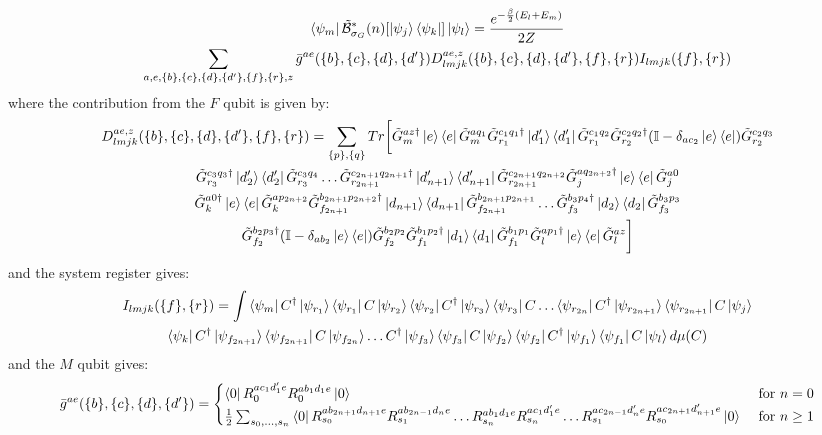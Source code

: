 \documentclass[aps,floatfix,10pt,amssymb,amsfont,amsmath,superscriptaddress,float,nofootinbib,longbibliography,nobalancelastpage,twocolumn]{revtex4-2}
\begin{document}
\begin{multline}
    \bra{\psi_m}\tilde{\mathcal{B}}^*_{\sigma_G}(n)[\ket{\psi_j}\bra{\psi_k}]\ket{\psi_l} = \frac{e^{-\frac{\beta}{2}(E_l+E_m)}}{2Z}\\\sum_{a,e,\{b\},\{c\},\{d\},\{d'\},\{f\},\{r\},z} \bar g^{ae}(\{b\},\{c\},\{d\},\{d'\}) D^{ae,z}_{lmjk}(\{b\},\{c\},\{d\},\{d'\},\{f\},\{r\})I_{lmjk}(\{f\},\{r\})
    \label{eq:B*def}
\end{multline}
where the contribution from the $F$ qubit is given by:
\begin{multline}
    D^{ae,z}_{lmjk}(\{b\},\{c\},\{d\},\{d'\},\{f\},\{r\}) = 
    \sum_{\{p\},\{q\}}
Tr\bigg[\tilde G^{az\dagger}_m\ket{e}\bra{e}\tilde G^{aq_1}_m\tilde G^{c_1q_1\dagger}_{r_1}\ket{d'_1}\bra{d'_1}\tilde G^{c_1q_2}_{r_1}\tilde G^{c_2q_2\dagger}_{r_2}(\mathbb{I} - \delta_{ac_2}\ket{e}\bra{e})\tilde G^{c_2q_3}_{r_2}\\\tilde G^{c_3q_3\dagger}_{r_3}\ket{d'_2}\bra{d'_2}\tilde G^{c_3q_4}_{r_3}\ldots
\tilde G^{c_{2n+1}q_{2n+1}\dagger}_{r_{2n+1}}\ket{d'_{n+1}}\bra{d'_{n+1}}\tilde G^{c_{2n+1}q_{2n+2}}_{r_{2n+1}}\tilde G^{aq_{2n+2}\dagger}_j\ket{e}\bra{e}\tilde G^{a0}_j\\ \tilde G^{a0\dagger}_k\ket{e}\bra{e}\tilde G^{ap_{2n+2}}_k\tilde G^{b_{2n+1}p_{2n+2}\dagger}_{f_{2n+1}}\ket{d_{n+1}}\bra{d_{n+1}}\tilde G^{b_{2n+1}p_{2n+1}}_{f_{2n+1}}\ldots \tilde G^{b_3p_4\dagger}_{f_3}\ket{d_2}\bra{d_2}\tilde G^{b_3p_3}_{f_3}\\\tilde G^{b_2p_3\dagger}_{f_2}(\mathbb{I} - \delta_{ab_2}\ket{e}\bra{e})\tilde G^{b_2p_2}_{f_2}\tilde G^{b_1p_2\dagger}_{f_1}\ket{d_1}\bra{d_1}\tilde G^{b_1p_1}_{f_1}\tilde G^{ap_1\dagger}_l\ket{e}\bra{e}\tilde G^{az}_l\bigg]
\end{multline}
and the system register gives:
\begin{multline}
I_{lmjk}(\{f\},\{r\})=\int\bra{\psi_m}C^{\dagger}\ket{\psi_{r_1}}\bra{\psi_{r_1}}C\ket{\psi_{r_2}}\bra{\psi_{r_2}}C^{\dagger}\ket{\psi_{r_3}}\bra{\psi_{r_3}}C\ldots \bra{\psi_{r_{2n}}}C^{\dagger}\ket{\psi_{r_{2n+1}}}\bra{\psi_{r_{2n+1}}}C\ket{\psi_{j}}\\
\bra{\psi_{k}}C^{\dagger}\ket{\psi_{f_{2n+1}}}\bra{\psi_{f_{2n+1}}}C\ket{\psi_{f_{2n}}}\ldots C^{\dagger}\ket{\psi_{f_3}}\bra{\psi_{f_3}}C\ket{\psi_{f_2}}\bra{\psi_{f_2}}C^{\dagger}\ket{\psi_{f_1}}\bra{\psi_{f_1}}C\ket{\psi_l}d\mu(C)
\end{multline}
and the $M$ qubit gives:
\begin{equation}
       \bar g^{ae}(\{b\},\{c\},\{d\},\{d'\}) = \begin{cases} \bra{0}R_{0}^{ac_1d'_1e}R_{0}^{ab_1d_1e}\ket{0}& \text{ for } n = 0\\
       \frac12\sum_{s_0,\ldots,s_n}
       \bra{0}R_{s_0}^{ab_{2n+1}d_{n+1}e}R_{s_1}^{ab_{2n-1}d_ne}\ldots
       R_{s_n}^{ab_{1}d_{1}e} R_{s_n}^{ac_{1}d'_{1}e}\ldots
       R_{s_1}^{ac_{2n-1}d'_ne}R_{s_0}^{ac_{2n+1}d'_{n+1}e}\ket{0} & \text{ for } n \geq 1
       \end{cases}
       \label{eq:gbar-definition}
\end{equation}
\end{document}
